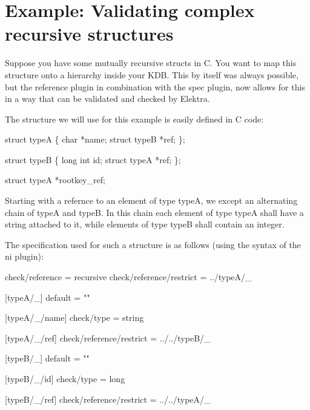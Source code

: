 \hypertarget{md_src_plugins_reference_examples_complex_README_src_plugins_reference_examples_complex_README_md}{}\section{Example\+: Validating complex recursive structures}\label{md_src_plugins_reference_examples_complex_README_src_plugins_reference_examples_complex_README_md}
Suppose you have some mutually recursive {\ttfamily struct}s in C. You want to map this structure onto a hierarchy inside your K\+DB. This by itself was always possible, but the reference plugin in combination with the spec plugin, now allows for this in a way that can be validated and checked by Elektra.

The structure we will use for this example is easily defined in C code\+:


\begin{DoxyCode}
\textcolor{keyword}{struct }typeA \{
  \textcolor{keywordtype}{char} *name;
  \textcolor{keyword}{struct }typeB *ref;   
\};

\textcolor{keyword}{struct }typeB \{
  \textcolor{keywordtype}{long} \textcolor{keywordtype}{int} id;
  \textcolor{keyword}{struct }typeA *ref;
\};

\textcolor{keyword}{struct }typeA *rootkey\_ref;
\end{DoxyCode}


Starting with a refernce to an element of type {\ttfamily typeA}, we except an alternating chain of {\ttfamily typeA} and {\ttfamily typeB}. In this chain each element of type {\ttfamily typeA} shall have a string attached to it, while elements of type {\ttfamily typeB} shall contain an integer.

The specification used for such a structure is as follows (using the syntax of the {\ttfamily ni} plugin)\+:


\begin{DoxyCode}
check/reference = recursive
check/reference/restrict = ../typeA/\_

[typeA/\_]
default = ""

[typeA/\_/name]
check/type = string

[typeA/\_/ref]
check/reference/restrict = ../../typeB/\_

[typeB/\_]
default = ""

[typeB/\_/id]
check/type = long

[typeB/\_/ref]
check/reference/restrict = ../../typeA/\_
\end{DoxyCode}


